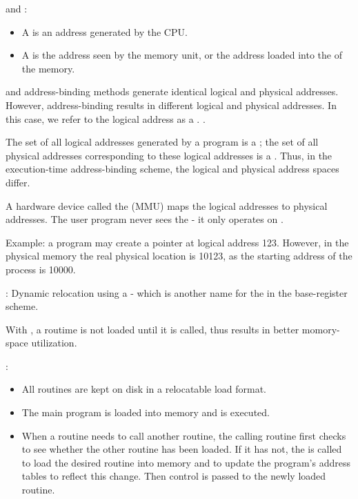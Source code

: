 
    \par {} and :
    \begin{itemize}
      \item A  is an address generated by the CPU.
      \item A  is the address seen by the memory unit, or the address loaded into the  of the memory.
    \end{itemize}
    \par {} and  address-binding methods generate identical logical and physical addresses. However,  address-binding results in different logical and physical addresses. In this case, we refer to the logical address as a . .
    \par The set of all logical addresses generated by a program is a ; the set of all physical addresses corresponding to these logical addresses is a . Thus, in the execution-time address-binding scheme, the logical and physical address spaces differ.
    \par A hardware device called the  (MMU) maps the logical addresses to physical addresses. The user program never sees the  - it only operates on .
    \par Example: a program may create a pointer at logical address 123. However, in the physical memory the real physical location is 10123, as the starting address of the process is 10000.
    \par {}: Dynamic relocation using a  - which is another name for the  in the base-register scheme.

    \par With , a routime is not loaded until it is called, thus results in better momory-space utilization.
    \par {}:
    \begin{itemize}
      \item All routines are kept on disk in a relocatable load format.
      \item The main program is loaded into memory and is executed.
      \item When a routine needs to call another routine, the calling routine first checks to see whether the other routine has been loaded. If it has not, the  is called to load the desired routine into memory and to update the program's address tables to reflect this change. Then control is passed to the newly loaded routine.
    \end{itemize}
      
